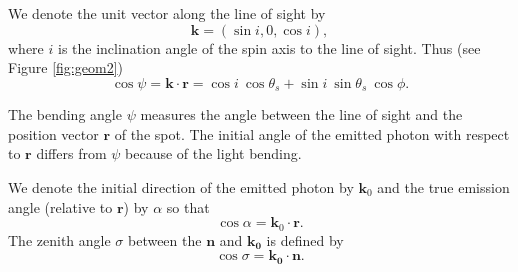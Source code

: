 \documentclass{wihuri}
\def\be{\begin{equation}}
\def\ee{\end{equation}}
\def\thetas{\theta_{s}}
\newcommand{\bmath}[1]{\boldsymbol{#1}}
\begin{document}
We denote the unit vector along the line of sight by 
\be
\bmath{k}=(\sin i, 0, \cos i), 
\ee 
where $i$ is the inclination angle of the spin axis to the line of sight. 
Thus (see Figure \ref{fig:geom2})
\be \label{eq:psi2}
  \cos\psi=\bmath{k}\cdot \bmath{r} = \cos i\ \cos\thetas+\sin i\ \sin \thetas\ \cos\phi.
\ee

The bending angle $\psi$ measures the angle between the line of sight and the position vector $\bmath{r}$ of the spot. The initial angle of the emitted photon with respect to
 ${\mathbf r}$ differs from $\psi$ because of the light bending.



We denote the initial direction of the emitted photon by $\bmath{k}_0$ %
and the true emission angle (relative to $\bmath{r}$) by $\alpha$ so that
\be
 \cos\alpha=\bmath{k}_0 \cdot \bmath{r}.
\ee
The zenith angle $\sigma$ between the $\bmath{n}$ and $\bmath{k_{0}}$ is defined by 
\be
\cos\sigma = \bmath{k_{0}}\cdot\bmath{n}.
\ee
\end{document}

